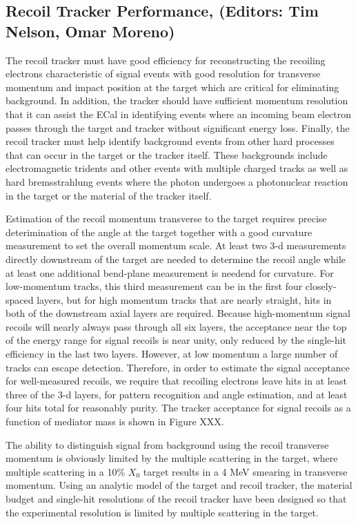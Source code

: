 \subsection{Recoil Tracker Performance, (Editors: Tim Nelson, Omar Moreno)}

The recoil tracker must have good efficiency for reconstructing the recoiling electrons characteristic of  signal events with good resolution for transverse momentum and impact position at the target which are critical for eliminating background. In addition, the tracker should have sufficient momentum resolution that it can assist the ECal in identifying events where an incoming beam electron passes through the target and tracker without significant energy loss. Finally, the recoil tracker must help identify background events from other hard processes that can occur in the target or the tracker itself. These backgrounds include electromagnetic tridents and other events with multiple charged tracks as well as hard bremsstrahlung events where the photon undergoes a photonuclear reaction in the target or the material of the tracker itself.  

Estimation of the recoil momentum transverse to the target requires precise deterimination of the angle at the target together with a good curvature measurement to set the overall momentum scale.  At least two 3-d measurements directly downstream of the target are needed to determine the recoil angle while at least one additional bend-plane measurement is needend for curvature.  For low-momentum tracks, this third measurement can be in the first four closely-spaced layers, but for high momentum tracks that are nearly straight, hits in both of the downstream axial layers are required.  Because high-momentum signal recoils will nearly always pass through all six layers, the acceptance near the top of the energy range for signal recoils is near unity, only reduced by the single-hit efficiency in the last two layers. However, at low momentum a large number of tracks can escape detection. Therefore, in order to estimate the signal acceptance for well-measured recoils, we require that recoiling electrons leave hits in at least three of the 3-d layers, for pattern recognition and angle estimation, and at least four hits total for reasonably purity.  The tracker acceptance for signal recoils as a function of mediator mass is shown in Figure XXX.

The ability to distinguish signal from background using the recoil transverse momentum is obviously limited by the multiple scattering in the target, where multiple scattering in a 10\% $X_0$ target results in a 4 MeV smearing in transverse momentum.  Using an analytic model of the target and recoil tracker, the material budget and single-hit resolutions of the recoil tracker have been designed so that the experimental resolution is limited by multiple scattering in the target.






